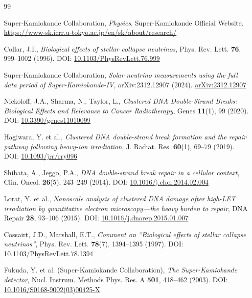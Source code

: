 \documentclass[12pt,a4paper]{article}
\begin{document}
\begin{thebibliography}{99}

Super-Kamiokande Collaboration,
\textit{Physics},
Super-Kamiokande Official Website.
\href{https://www-sk.icrr.u-tokyo.ac.jp/en/sk/about/research/}{https://www-sk.icrr.u-tokyo.ac.jp/en/sk/about/research/}

Collar, J.I.,
\textit{Biological effects of stellar collapse neutrinos},
Phys. Rev. Lett. \textbf{76}, 999--1002 (1996).
DOI: \href{https://doi.org/10.1103/PhysRevLett.76.999}{10.1103/PhysRevLett.76.999}

Super-Kamiokande Collaboration,
\textit{Solar neutrino measurements using the full data period of Super-Kamiokande-IV},
arXiv:2312.12907 (2024).
\href{https://arxiv.org/abs/2312.12907}{arXiv:2312.12907}

Nickoloff, J.A., Sharma, N., Taylor, L.,
\textit{Clustered DNA Double-Strand Breaks: Biological Effects and Relevance to Cancer Radiotherapy},
Genes \textbf{11}(1), 99 (2020).
DOI: \href{https://doi.org/10.3390/genes11010099}{10.3390/genes11010099}

Hagiwara, Y. et al.,
\textit{Clustered DNA double-strand break formation and the repair pathway following heavy-ion irradiation},
J. Radiat. Res. \textbf{60}(1), 69--79 (2019).
DOI: \href{https://doi.org/10.1093/jrr/rry096}{10.1093/jrr/rry096}

Shibata, A., Jeggo, P.A.,
\textit{DNA double-strand break repair in a cellular context},
Clin. Oncol. \textbf{26}(5), 243--249 (2014).
DOI: \href{https://doi.org/10.1016/j.clon.2014.02.004}{10.1016/j.clon.2014.02.004}

Lorat, Y. et al.,
\textit{Nanoscale analysis of clustered DNA damage after high-LET irradiation by quantitative electron microscopy---the heavy burden to repair},
DNA Repair \textbf{28}, 93--106 (2015).
DOI: \href{https://doi.org/10.1016/j.dnarep.2015.01.007}{10.1016/j.dnarep.2015.01.007}

Cossairt, J.D., Marshall, E.T.,
\textit{Comment on ``Biological effects of stellar collapse neutrinos''},
Phys. Rev. Lett. \textbf{78}(7), 1394--1395 (1997).
DOI: \href{https://doi.org/10.1103/PhysRevLett.78.1394}{10.1103/PhysRevLett.78.1394}

Fukuda, Y. et al. (Super-Kamiokande Collaboration),
\textit{The Super-Kamiokande detector},
Nucl. Instrum. Methods Phys. Res. A \textbf{501}, 418--462 (2003).
DOI: \href{https://doi.org/10.1016/S0168-9002(03)00425-X}{10.1016/S0168-9002(03)00425-X}

\end{thebibliography}
\end{document}
